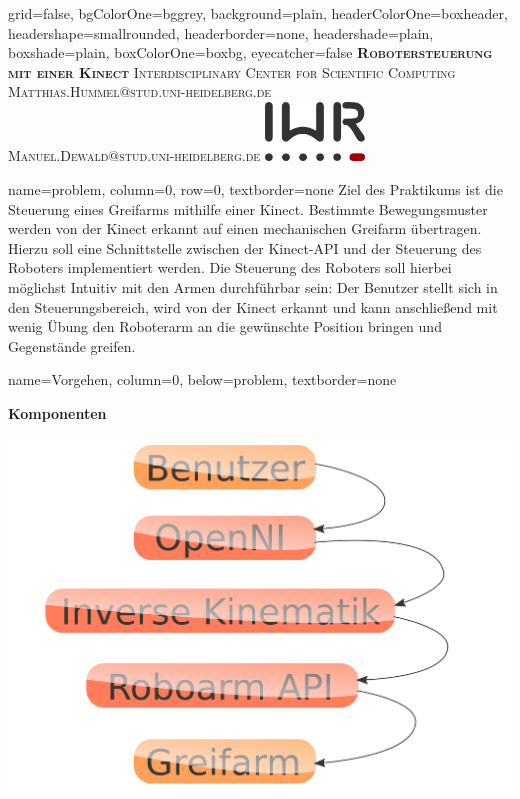 \documentclass[portrait,a0paper]{baposter}
\begin{document}
\begin{poster}
  {
  grid=false,
  bgColorOne=bggrey,
  background=plain,
  headerColorOne=boxheader,
  headershape=smallrounded,
  headerborder=none,
  headershade=plain,
  boxshade=plain,
  boxColorOne=boxbg,
  eyecatcher=false
  }
  { } 
 {\bf\textsc{Robotersteuerung mit einer Kinect}\vspace{0.5em}}
  {
  \textsc{Interdisciplinary Center for Scientific Computing}  \vspace*{0.5em} \\
  \small \textsc{Matthias.Hummel@stud.uni-heidelberg.de} \\
  \small \textsc{Manuel.Dewald@stud.uni-heidelberg.de}
  }
  {%
    \includegraphics[width=100px]{imgs/IWRlogo1.png}
  }
  
    {
    name=problem,
    column=0,
    row=0,
    textborder=none
    }
    {
Ziel des Praktikums ist die Steuerung eines Greifarms mithilfe einer Kinect.
Bestimmte Bewegungsmuster werden von der Kinect erkannt auf einen mechanischen Greifarm übertragen.
Hierzu soll eine Schnittstelle zwischen der Kinect-API und der Steuerung des Roboters implementiert werden.
Die Steuerung des Roboters soll hierbei möglichst Intuitiv mit den Armen durchführbar sein:
Der Benutzer stellt sich in den Steuerungsbereich, wird von der Kinect erkannt und kann anschließend mit wenig Übung den Roboterarm an die gewünschte Position bringen und Gegenstände greifen.
 }

    {
    name=Vorgehen,
    column=0,
    below=problem,
    textborder=none
    }
    {
\textbf{Komponenten}

\includegraphics[width=\textwidth]{imgs/komponenten.png}

}
\end{poster}
\end{document}
